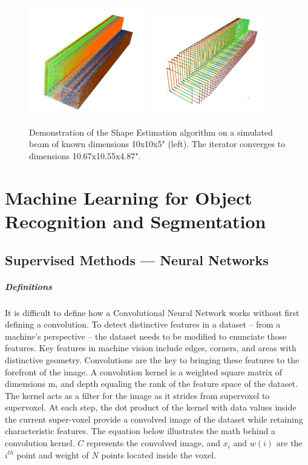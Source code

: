 \documentclass[12pt]{drexelthesis}
\let\Oldsection\section
\renewcommand{\section}{\FloatBarrier\Oldsection}
\let\Oldsubsection\subsection
\renewcommand{\subsection}{\FloatBarrier\Oldsubsection}
\begin{document}
\begin{figure}[!ht]
	\centering
		\includegraphics[width=2in]{cross-section-estimation/noiselessbeam(10x10x5).JPG}
		\includegraphics[width=2in]{cross-section-estimation/newtonraphsonconvergence(10x10x5).JPG}
	\caption[Demonstration of the Informed Shape Estimation algorithm on a simulated point cloud.]{\centering Demonstration of the Shape Estimation algorithm on a simulated beam of known dimensions 10x10x5" (left). The iterator converges to dimensions 10.67x10.55x4.87".}
\end{figure}




 


\section{Machine Learning for Object Recognition and Segmentation}
\label{sec:machinelearning}
\subsection{Supervised Methods --- Neural Networks}
\subparagraph{Definitions}
It is difficult to define how a Convolutional Neural Network works without first defining a convolution. To detect distinctive features in a dataset – from a machine’s perspective – the dataset needs to be modified to enunciate those features. Key features in machine vision include edges, corners, and areas with distinctive geometry. Convolutions are the key to bringing these features to the forefront of the image.
A convolution kernel is a weighted square matrix of dimensions m, and depth equaling the rank of the feature space of the dataset. The kernel acts as a filter for the image as it strides from supervoxel to supervoxel. At each step, the dot product of the kernel with data values inside the current super-voxel provide a convolved image of the dataset while retaining characteristic features. The equation below illustrates the math behind a convolution kernel. $C$ represents the convolved image, and $x_{i}$ and $w(i)$ are the $i^{th}$ point and weight of $N$ points located inside the voxel.
\end{document}
